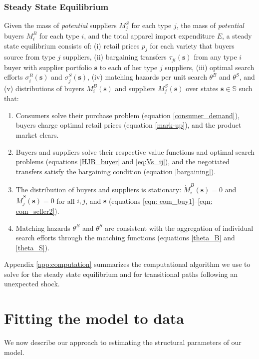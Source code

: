 \documentclass[12pt]{article} \usepackage{amsmath,amssymb,amsthm,geometry,graphicx,setspace,algorithm,algpseudocode,float}
\begin{document}
\subsubsection{Steady State Equilibrium}
\label{sec:equilibrium}
Given the mass of \textit{potential} suppliers $M_j^S$ for each type $j$, the mass of \textit{potential} buyers $M_i^B$ for each type $i$, and the total apparel import expenditure $E$, a steady state equilibrium consists of:
(i) retail prices $p_j$ for each variety that buyers source from type $j$ suppliers,  (ii) bargaining transfers $\tau_{ji}(\mathbf{s})$ from any type $i$ buyer with supplier portfolio $\mathbf{s}$ to each of her type $j$ suppliers, (iii) optimal search efforts $\sigma_i^B(\mathbf{s})$ and $\sigma_j^S(\mathbf{s})$, (iv) matching hazards per unit search $\theta^B$ and $\theta^S$, and (v) distributions of buyers $M_i^B(\mathbf{s})$ and suppliers $M_j^S(\mathbf{s})$ over states $\mathbf{s}\in \mathbb{S}$ such that: 
\begin{enumerate}
    \item[(i)] Consumers solve their purchase problem (equation \ref{consumer_demand}), buyers charge optimal retail prices (equation \ref{mark-up}), and the product market clears.
    \item[(ii)] Buyers and suppliers solve their respective value functions and optimal search problems (equations \ref{HJB_buyer} and \ref{eq:Vs_ij}), and the negotiated transfers satisfy the bargaining condition (equation \ref{bargaining}).
    \item[(iii)] The distribution of buyers and suppliers is stationary: $\dot{M}_{i}^{B}(\mathbf{s}) = 0$ and $\dot{M}_{j}^{S}(\mathbf{s}) = 0$ for all $i, j$, and $ \mathbf{s}$ (equations \ref{eqn: eom_buy1}--\ref{eqn: eom_seller2}).
    \item[(iv)] Matching hazards $\theta^B$ and $\theta^S$ are consistent with the aggregation of individual search efforts through the matching functions (equations \ref{theta_B} and \ref{theta_S}).
\end{enumerate}
Appendix \ref{app:computation} summarizes the computational algorithm we use to solve for the steady state equilibrium and for transitional paths following an unexpected shock. 

\section{Fitting the model to data}
\label{sec:estimation}

We now describe our approach to estimating the structural parameters of our model.
\end{document}
